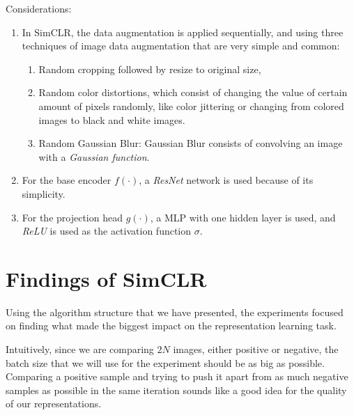 Considerations:
\begin{enumerate}
\item In SimCLR, the data augmentation is applied sequentially, and using three techniques of image data augmentation that are very simple and common:
\begin{enumerate}
\item Random cropping followed by resize to original size,
\item Random color distortions, which consist of changing the value of certain amount of pixels randomly, like color jittering or changing from colored images to black and white images.
\item Random Gaussian Blur: Gaussian Blur consists of convolving an image with a \emph{Gaussian function}.
\end{enumerate}

\item For the base encoder $f(\cdot)$, a \emph{ResNet} network is used because of its simplicity.
\item For the projection head $g(\cdot)$, a MLP with one hidden layer is used, and \emph{ReLU} is used as the activation function $\sigma$.
\end{enumerate}



\section{Findings of SimCLR}

    Using the algorithm structure that we have presented, the experiments focused on finding what made the biggest impact on the representation learning task. 
    
    Intuitively, since we are comparing $2N$ images, either positive or negative, the batch size that we will use for the experiment should be as big as possible. Comparing a positive sample and trying to push it apart from as much negative samples as possible in the same iteration sounds like a good idea for the quality of our representations.
    
